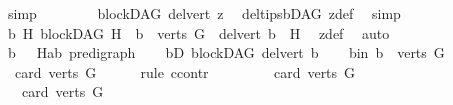 \begin{isabellebody}
\ simp\isanewline
\ \ \isamarkupfalse%
\isanewline
\ \ \isamarkupfalse%
\ \isamarkupfalse%
\ {\isachardoublequoteopen}blockDAG\ {\isacharparenleft}{\kern0pt}del{\isacharunderscore}{\kern0pt}vert\ z{\isacharparenright}{\kern0pt}{\isachardoublequoteclose}\ \isamarkupfalse%
\ del{\isacharunderscore}{\kern0pt}tips{\isacharunderscore}{\kern0pt}bDAG\ z{\isacharunderscore}{\kern0pt}def\ \isamarkupfalse%
\ simp\isanewline
\ \ \isamarkupfalse%
\ \isamarkupfalse%
\ {\isachardoublequoteopen}{\isacharparenleft}{\kern0pt}{\isasymexists}b\ H{\isachardot}{\kern0pt}\ blockDAG\ H\ {\isasymand}\ b\ {\isasymin}\ verts\ G\ {\isasymand}\ del{\isacharunderscore}{\kern0pt}vert\ b\ {\isacharequal}{\kern0pt}\ H{\isacharparenright}{\kern0pt}{\isachardoublequoteclose}\ \isamarkupfalse%
\ z{\isacharunderscore}{\kern0pt}def\ \isamarkupfalse%
\ auto\isanewline
{}\isamarkupfalse%
\ \isanewline
\ \ \isamarkupfalse%
\ b\ \ \ H{\isacharcolon}{\kern0pt}{\isacharcolon}{\kern0pt}{\isachardoublequoteopen}{\isacharparenleft}{\kern0pt}{\isacharprime}{\kern0pt}a{\isacharcomma}{\kern0pt}{\isacharprime}{\kern0pt}b{\isacharparenright}{\kern0pt}\ pre{\isacharunderscore}{\kern0pt}digraph{\isachardoublequoteclose}\isanewline
\ \ \isamarkupfalse%
\ bD{\isacharcolon}{\kern0pt}\ {\isachardoublequoteopen}blockDAG\ {\isacharparenleft}{\kern0pt}del{\isacharunderscore}{\kern0pt}vert\ b{\isacharparenright}{\kern0pt}{\isachardoublequoteclose}\isanewline
\ \ \isamarkupfalse%
\ b{\isacharunderscore}{\kern0pt}in{\isacharcolon}{\kern0pt}\ {\isachardoublequoteopen}b\ {\isasymin}\ verts\ G{\isachardoublequoteclose}\isanewline
\ \ \isamarkupfalse%
\ \ {\isachardoublequoteopen}card\ {\isacharparenleft}{\kern0pt}verts\ G{\isacharparenright}{\kern0pt}\ {\isachargreater}{\kern0pt}\ {}{\isachardoublequoteclose}\isanewline
\ \ \isamarkupfalse%
\ {\isacharparenleft}{\kern0pt}rule\ ccontr{\isacharparenright}{\kern0pt}\isanewline
\ \ \ \ \isamarkupfalse%
\ {\isachardoublequoteopen}{\isasymnot}\ {}\ {\isacharless}{\kern0pt}\ card\ {\isacharparenleft}{\kern0pt}verts\ G{\isacharparenright}{\kern0pt}{\isachardoublequoteclose}\isanewline
\ \ \ \ \isamarkupfalse%
\ \isamarkupfalse%
\ {\isachardoublequoteopen}{}\ {\isacharequal}{\kern0pt}\ card\ {\isacharparenleft}{\kern0pt}verts\ G{\isacharparenright}{\kern0pt}{\isachardoublequoteclose}\ \isamarkupfalse%

\end{isabellebody}
